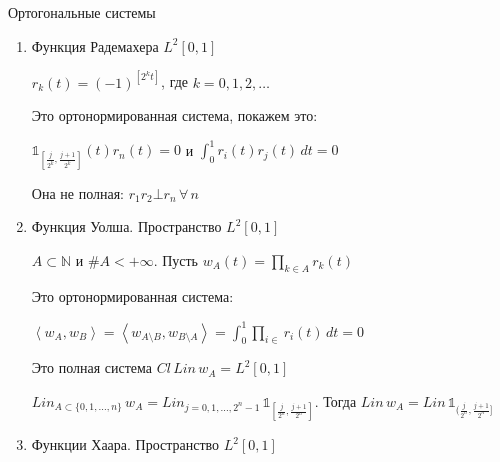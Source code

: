 \begin{example}
    Ортогональные системы

    \begin{enumerate}
        \item {
            Функция Радемахера $L^2 [0, 1]$

            $r_k (t) = (-1)^{[2^k t]}$, где $k = 0, 1, 2, \ldots$

            Это ортонормированная система, покажем это:

            $\mathds{1}_{[\frac{j}{2^k}, \frac{j + 1}{2^k}]} (t) r_n (t) = 0$ и $\int_{0}^1 r_i (t) r_j (t) \, dt = 0$

            Она не полная: $r_1r_2 \bot r_n \, \forall \, n$
        }
        \item {
            Функция Уолша. Пространство $L^2 [0, 1]$

            $A \subset \mathbb{N}$ и $\#A < +\infty$. Пусть $w_A (t) = \prod\limits_{k \in A} r_k (t)$

            Это ортонормированная система:

            $\left < w_A, w_B \right > = \left < w_{A \setminus B} , w_{B \setminus A} \right > =
            \int_0^1 \prod_{i \in } r_i (t) \, dt = 0$

            Это полная система $Cl \, Lin \, w_A = L^2 [0, 1]$

            $Lin_{A \subset \{ 0, 1, \ldots, n \}} \,  w_A = Lin_{j = 0, 1, \ldots, 2^n - 1} \, \mathds{1}_{[\frac{j}{2^n}, \frac{j + 1}{2^n}]}$.
            Тогда $Lin \, w_A = Lin \, \mathds{1}_{(\frac{j}{2^n}, \frac{j + 1}{2^n}]}$
        }
        \item {
            Функции Хаара. Пространство $L^2 [0, 1]$

}
\end{enumerate}
\end{example}
